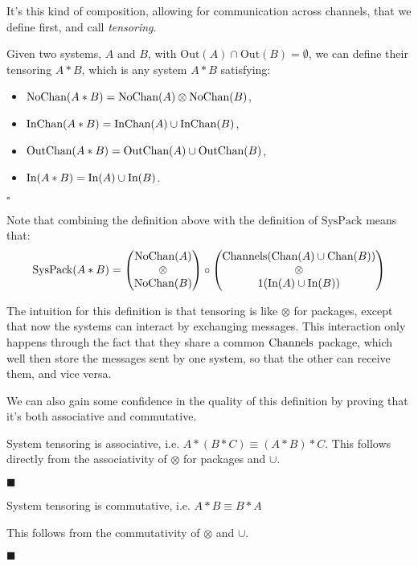It's this kind of composition, allowing for communication across
channels, that we define first, and call \emph{tensoring}.

\begin{definition}
Given two systems, $A$ and $B$, with \(\text{Out}(A) \cap \text{Out}(B) = \emptyset\), we can define their tensoring $A * B$,
which is any system $A * B$ satisfying:
\begin{itemize}
  \item $\text{NoChan}(A * B) = \text{NoChan}(A) \otimes \text{NoChan}(B)$,
  \item $\text{InChan}(A * B) = \text{InChan}(A) \cup \text{InChan}(B)$,
  \item $\text{OutChan}(A * B) = \text{OutChan}(A) \cup \text{OutChan}(B)$,
  \item $\text{In}(A * B) = \text{In}(A) \cup \text{In}(B)$.
\end{itemize}

$\square$
\end{definition}

Note that combining the definition above with the definition of $\text{SysPack}$
means that:
$$
\text{SysPack}(A * B) =
\begin{pmatrix}
\text{NoChan}(A)\cr
\otimes\cr
\text{NoChan}(B)\cr
\end{pmatrix}
\circ
\begin{pmatrix}
\text{Channels}(\text{Chan}(A) \cup \text{Chan}(B))\cr
\otimes\cr
1(\text{In}(A) \cup \text{In}(B))\cr
\end{pmatrix}
$$

The intuition for this definition is that tensoring is like $\otimes$
for packages, except that now the systems can interact by exchanging
messages.
This interaction only happens through the fact that they
share a common $\text{Channels}$ package, which well then store
the messages sent by one system, so that the other can receive them,
and vice versa.

We can also gain some confidence in the quality of this definition
by proving that it's both associative and commutative.

\begin{lemma}
System tensoring is associative, i.e. $A * (B * C) \equiv (A * B) * C$.
 This follows directly from the associativity
of $\otimes$ for packages and $\cup$.

$\blacksquare$
\end{lemma}

\begin{lemma}
System tensoring is commutative, i.e. $A * B \equiv B * A$

 This follows from the commutativity of $\otimes$ and $\cup$.

$\blacksquare$
\end{lemma}


